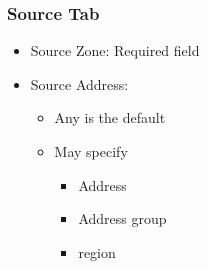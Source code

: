 \subsubsection{Source Tab}
    \begin{itemize}
        \item Source Zone: Required field
        \item Source Address:
            \begin{itemize}
                \item Any is the default
                \item May specify
                    \begin{itemize}
                        \item Address
                        \item Address group
                        \item region
                    \end{itemize}
            \end{itemize}
    \end{itemize}

